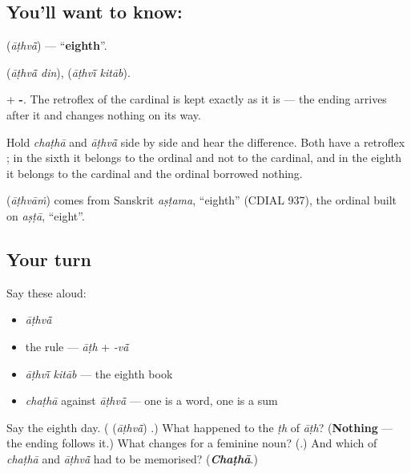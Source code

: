 \subsection*{You'll want to know: }
\textbf{} (\emph{āṭhvā̃}) — \textquotedblleft{}\textbf{eighth}\textquotedblright{}.

\textbf{ } (\emph{āṭhvā̃ din}), \textbf{ } (\emph{āṭhvī̃ kitāb}).

\textbf{} + \textbf{-}. The retroflex \textbf{} of the cardinal is kept exactly as it is — the ending arrives after it and changes nothing on its way.

Hold \emph{chaṭhā} and \emph{āṭhvā̃} side by side and hear the difference. Both have a retroflex \textbf{}; in the sixth it belongs to the ordinal and not to the cardinal, and in the eighth it belongs to the cardinal and the ordinal borrowed nothing.

\begin{cousinweb}
\textbf{} (\emph{āṭhvāṁ}) comes from Sanskrit \emph{aṣṭama}, \textquotedblleft{}eighth\textquotedblright{} (CDIAL 937), the ordinal built on \emph{aṣṭā}, \textquotedblleft{}eight\textquotedblright{}.
\end{cousinweb}

\subsection*{Your turn}
Say these aloud:

\begin{itemize}
\raggedright
  \item \emph{āṭhvā̃}
  \item the rule — \emph{āṭh} + \emph{-vā̃}
  \item \emph{āṭhvī̃ kitāb} — the eighth book
  \item \emph{chaṭhā} against \emph{āṭhvā̃} — one is a word, one is a sum
\end{itemize}

\begin{tcolorbox}[breakable,colback=teal!4,colframe=teal!35!black,title={Before you move on}]
Say the eighth day. (\textbf{} (\emph{āṭhvā̃}) \textbf{}.) What happened to the \emph{ṭh} of \emph{āṭh}? (\textbf{Nothing} — the ending follows it.) What changes for a feminine noun? (\textbf{}.) And which of \emph{chaṭhā} and \emph{āṭhvā̃} had to be memorised? (\emph{\textbf{Chaṭhā}}.)
\end{tcolorbox}
